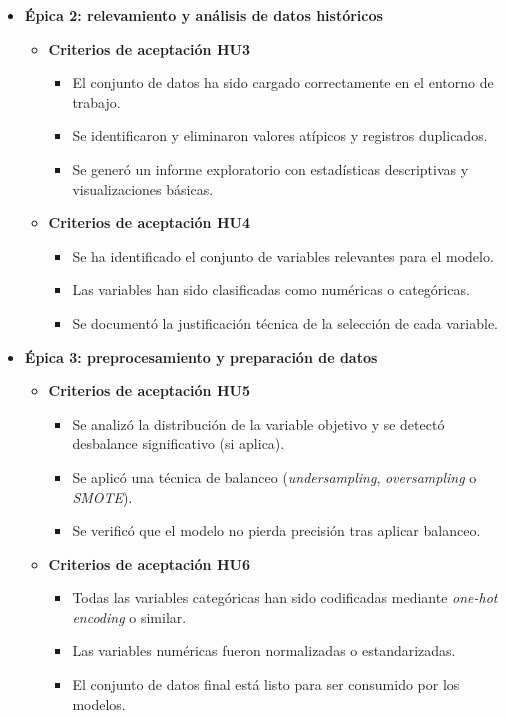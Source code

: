 \documentclass[
11pt, %
]{charter}
\begin{document}
\begin{itemize}
  \item \textbf{Épica 2: relevamiento y análisis de datos históricos}
    \begin{itemize}
      \item \textbf{Criterios de aceptación HU3}
      \begin{itemize}
        \item El conjunto de datos ha sido cargado correctamente en el entorno de trabajo.
        \item Se identificaron y eliminaron valores atípicos y registros duplicados.
        \item Se generó un informe exploratorio con estadísticas descriptivas y visualizaciones básicas.
      \end{itemize}
      \item \textbf{Criterios de aceptación HU4}
      \begin{itemize}
        \item Se ha identificado el conjunto de variables relevantes para el modelo.
        \item Las variables han sido clasificadas como numéricas o categóricas.
        \item Se documentó la justificación técnica de la selección de cada variable.
      \end{itemize}
    \end{itemize}
  \newpage
  \item \textbf{Épica 3: preprocesamiento y preparación de datos}
    \begin{itemize}
      \item \textbf{Criterios de aceptación HU5}
      \begin{itemize}
        \item Se analizó la distribución de la variable objetivo y se detectó desbalance significativo (si aplica).
        \item Se aplicó una técnica de balanceo (\textit{undersampling}, \textit{oversampling} o \textit{SMOTE}).
        \item Se verificó que el modelo no pierda precisión tras aplicar balanceo.
      \end{itemize}
      \item \textbf{Criterios de aceptación HU6}
      \begin{itemize}
        \item Todas las variables categóricas han sido codificadas mediante \textit{one-hot encoding} o similar.
        \item Las variables numéricas fueron normalizadas o estandarizadas.
        \item El conjunto de datos final está listo para ser consumido por los modelos.
      \end{itemize}
    \end{itemize}


\end{itemize}
\end{document}
